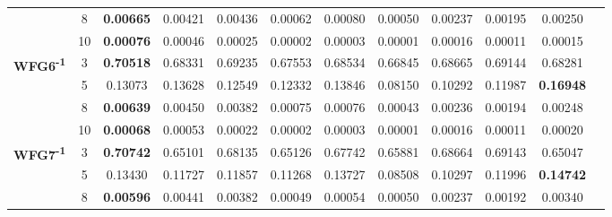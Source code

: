 \documentclass{sig-alternate}
\begin{document}
\begin{table}[!htb]
\begin{tabular}{|c|c|c|c|c|c|c|c|c|c|c|c|}
                                                      & 8          & \textbf{0.00665}   & 0.00421            & 0.00436               & 0.00062          & 0.00080             & 0.00050             & 0.00237            & 0.00195              & 0.00250            \\ \cline{2-11} 
                                                      & 10         & \textbf{0.00076}   & 0.00046            & 0.00025               & 0.00002          & 0.00003             & 0.00001             & 0.00016            & 0.00011              & 0.00015            \\ \hline
\multirow{4}{*}{\textbf{WFG6\textsuperscript{-1}}}  & 3          & \textbf{0.70518}   & 0.68331            & 0.69235               & 0.67553          & 0.68534             & 0.66845             & 0.68665            & 0.69144              & 0.68281            \\ \cline{2-11} 
                                                      & 5          & 0.13073            & 0.13628            & 0.12549               & 0.12332          & 0.13846             & 0.08150             & 0.10292            & 0.11987              & \textbf{0.16948}   \\ \cline{2-11} 
                                                      & 8          & \textbf{0.00639}   & 0.00450            & 0.00382               & 0.00075          & 0.00076             & 0.00043             & 0.00236            & 0.00194              & 0.00248            \\ \cline{2-11} 
                                                      & 10         & \textbf{0.00068}   & 0.00053            & 0.00022               & 0.00002          & 0.00003             & 0.00001             & 0.00016            & 0.00011              & 0.00020            \\ \hline
\multirow{4}{*}{\textbf{WFG7\textsuperscript{-1}}}  & 3          & \textbf{0.70742}   & 0.65101            & 0.68135               & 0.65126          & 0.67742             & 0.65881             & 0.68664            & 0.69143              & 0.65047            \\ \cline{2-11} 
                                                      & 5          & 0.13430            & 0.11727            & 0.11857               & 0.11268          & 0.13727             & 0.08508             & 0.10297            & 0.11996              & \textbf{0.14742}   \\ \cline{2-11} 
                                                      & 8          & \textbf{0.00596}   & 0.00441            & 0.00382               & 0.00049          & 0.00054             & 0.00050             & 0.00237            & 0.00192              & 0.00340            \\ \cline{2-11} 

\end{tabular}
\end{table}
\end{document}
